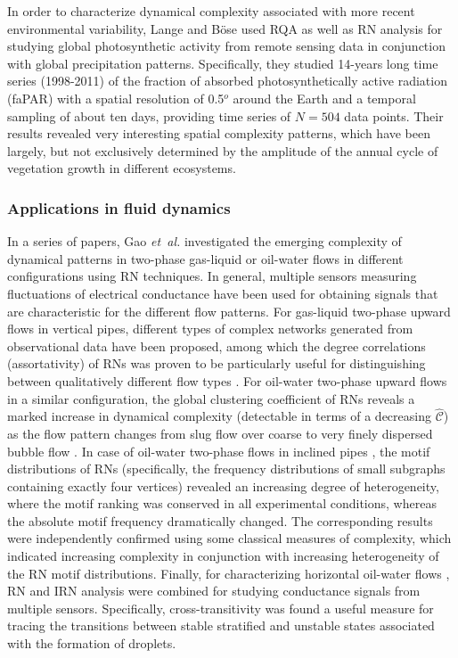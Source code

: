 In order to characterize dynamical complexity associated with more recent environmental variability, Lange and B\"ose \cite{Boese2012,Lange2013Book} used RQA as well as RN analysis for studying global photosynthetic activity from remote sensing data in conjunction with global precipitation patterns. Specifically, they studied 14-years long time series (1998-2011) of the fraction of absorbed photosynthetically active radiation (faPAR) with a spatial resolution of 0.5$^o$ around the Earth and a temporal sampling of about ten days, providing time series of $N=504$ data points. Their results revealed very interesting spatial complexity patterns, which have been largely, but not exclusively determined by the amplitude of the annual cycle of vegetation growth in different ecosystems.


\subsubsection{Applications in fluid dynamics}

In a series of papers, Gao \textit{et~al.} investigated the emerging complexity of dynamical patterns in two-phase gas-liquid or oil-water flows in different configurations using RN techniques. In general, multiple sensors measuring fluctuations of electrical conductance have been used for obtaining signals that are characteristic for the different flow patterns. For gas-liquid two-phase upward flows in vertical pipes, different types of complex networks generated from observational data have been proposed, among which the degree correlations (assortativity) of RNs was proven to be particularly useful for distinguishing between qualitatively different flow types \cite{Gao2009}. For oil-water two-phase upward flows in a similar configuration, the global clustering coefficient of RNs reveals a marked increase in dynamical complexity (detectable in terms of a decreasing $\hat{\mathcal{C}}$) as the flow pattern changes from slug flow over coarse to very finely dispersed bubble flow \cite{Gao2013PLA}. In case of oil-water two-phase flows in inclined pipes \cite{Gao2010PRE}, the motif distributions of RNs (specifically, the frequency distributions of small subgraphs containing exactly four vertices) revealed an increasing degree of heterogeneity, where the motif ranking was conserved in all experimental conditions, whereas the absolute motif frequency dramatically changed. The corresponding results were independently confirmed using some classical measures of complexity, which indicated increasing complexity in conjunction with increasing heterogeneity of the RN motif distributions. Finally, for characterizing horizontal oil-water flows \cite{Gao2013EPL}, RN and IRN analysis were combined for studying conductance signals from multiple sensors. Specifically, cross-transitivity was found a useful measure for tracing the transitions between stable stratified and unstable states associated with the formation of droplets.


